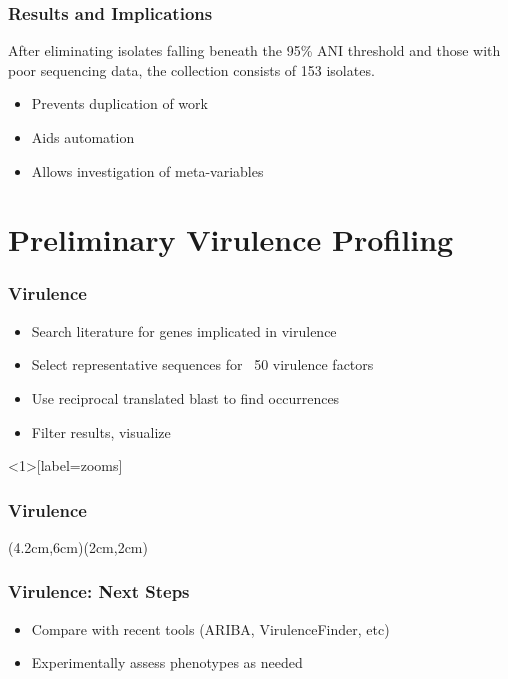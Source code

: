 \documentclass[10pt, compress]{beamer}
\begin{document}
\begin{frame}[fragile]
  \frametitle{Results and Implications}
  After eliminating isolates falling beneath the 95\% ANI threshold and those with poor sequencing data, the collection consists of 153 isolates.
  \begin{itemize}
  \item Prevents duplication of work
  \item Aids automation
  \item Allows investigation of meta-variables
    \end{itemize}
\end{frame}


\section{Preliminary Virulence Profiling}

\begin{frame}[fragile]
  \frametitle{Virulence}

  \begin{itemize}
  \item Search literature for genes implicated in virulence
  \item Select representative sequences for ~50 virulence factors
  \item Use reciprocal translated blast to find occurrences
  \item Filter results, visualize
  \end{itemize}
\end{frame}

\begin{frame}<1>[label=zooms]
  \frametitle<1>{Virulence}
  (4.2cm,6cm)(2cm,2cm)
  \end{frame}

\begin{frame}[fragile]
  \frametitle{Virulence: Next Steps}
  \begin{itemize}
  \item Compare with recent tools (ARIBA, VirulenceFinder, etc)
  \item Experimentally assess phenotypes as needed
  \end{itemize}
\end{frame}
\end{document}

